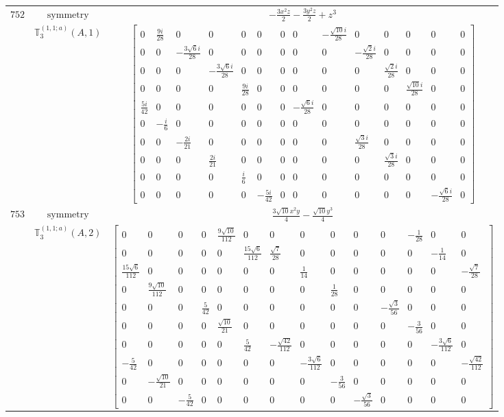 \documentclass[fleqn,8pt,landscape]{jsarticle}
\begin{document}
\begin{longtable}{ccc}
$ 752 $ & $ \text{symmetry} $ & $ - \frac{3 x^{2} z}{2} - \frac{3 y^{2} z}{2} + z^{3} $ \\
$  $ & $ \mathbb{T}_{3}^{(1,1;a)}(A,1) $ & $ \begin{bmatrix} 0 & \frac{9 i}{28} & 0 & 0 & 0 & 0 & 0 & 0 & - \frac{\sqrt{10} i}{28} & 0 & 0 & 0 & 0 & 0 \\ 0 & 0 & - \frac{3 \sqrt{6} i}{28} & 0 & 0 & 0 & 0 & 0 & 0 & - \frac{\sqrt{2} i}{28} & 0 & 0 & 0 & 0 \\ 0 & 0 & 0 & - \frac{3 \sqrt{6} i}{28} & 0 & 0 & 0 & 0 & 0 & 0 & \frac{\sqrt{2} i}{28} & 0 & 0 & 0 \\ 0 & 0 & 0 & 0 & \frac{9 i}{28} & 0 & 0 & 0 & 0 & 0 & 0 & \frac{\sqrt{10} i}{28} & 0 & 0 \\ \frac{5 i}{42} & 0 & 0 & 0 & 0 & 0 & 0 & - \frac{\sqrt{6} i}{28} & 0 & 0 & 0 & 0 & 0 & 0 \\ 0 & - \frac{i}{6} & 0 & 0 & 0 & 0 & 0 & 0 & 0 & 0 & 0 & 0 & 0 & 0 \\ 0 & 0 & - \frac{2 i}{21} & 0 & 0 & 0 & 0 & 0 & 0 & \frac{\sqrt{3} i}{28} & 0 & 0 & 0 & 0 \\ 0 & 0 & 0 & \frac{2 i}{21} & 0 & 0 & 0 & 0 & 0 & 0 & \frac{\sqrt{3} i}{28} & 0 & 0 & 0 \\ 0 & 0 & 0 & 0 & \frac{i}{6} & 0 & 0 & 0 & 0 & 0 & 0 & 0 & 0 & 0 \\ 0 & 0 & 0 & 0 & 0 & - \frac{5 i}{42} & 0 & 0 & 0 & 0 & 0 & 0 & - \frac{\sqrt{6} i}{28} & 0 \end{bmatrix} $ \\ \hline
$ 753 $ & $ \text{symmetry} $ & $ \frac{3 \sqrt{10} x^{2} y}{4} - \frac{\sqrt{10} y^{3}}{4} $ \\
$  $ & $ \mathbb{T}_{3}^{(1,1;a)}(A,2) $ & $ \begin{bmatrix} 0 & 0 & 0 & 0 & \frac{9 \sqrt{10}}{112} & 0 & 0 & 0 & 0 & 0 & 0 & - \frac{1}{28} & 0 & 0 \\ 0 & 0 & 0 & 0 & 0 & \frac{15 \sqrt{6}}{112} & \frac{\sqrt{7}}{28} & 0 & 0 & 0 & 0 & 0 & - \frac{1}{14} & 0 \\ \frac{15 \sqrt{6}}{112} & 0 & 0 & 0 & 0 & 0 & 0 & \frac{1}{14} & 0 & 0 & 0 & 0 & 0 & - \frac{\sqrt{7}}{28} \\ 0 & \frac{9 \sqrt{10}}{112} & 0 & 0 & 0 & 0 & 0 & 0 & \frac{1}{28} & 0 & 0 & 0 & 0 & 0 \\ 0 & 0 & 0 & \frac{5}{42} & 0 & 0 & 0 & 0 & 0 & 0 & - \frac{\sqrt{3}}{56} & 0 & 0 & 0 \\ 0 & 0 & 0 & 0 & \frac{\sqrt{10}}{21} & 0 & 0 & 0 & 0 & 0 & 0 & - \frac{3}{56} & 0 & 0 \\ 0 & 0 & 0 & 0 & 0 & \frac{5}{42} & - \frac{\sqrt{42}}{112} & 0 & 0 & 0 & 0 & 0 & - \frac{3 \sqrt{6}}{112} & 0 \\ - \frac{5}{42} & 0 & 0 & 0 & 0 & 0 & 0 & - \frac{3 \sqrt{6}}{112} & 0 & 0 & 0 & 0 & 0 & - \frac{\sqrt{42}}{112} \\ 0 & - \frac{\sqrt{10}}{21} & 0 & 0 & 0 & 0 & 0 & 0 & - \frac{3}{56} & 0 & 0 & 0 & 0 & 0 \\ 0 & 0 & - \frac{5}{42} & 0 & 0 & 0 & 0 & 0 & 0 & - \frac{\sqrt{3}}{56} & 0 & 0 & 0 & 0 \end{bmatrix} $ \\ \hline

\end{longtable}
\end{document}
